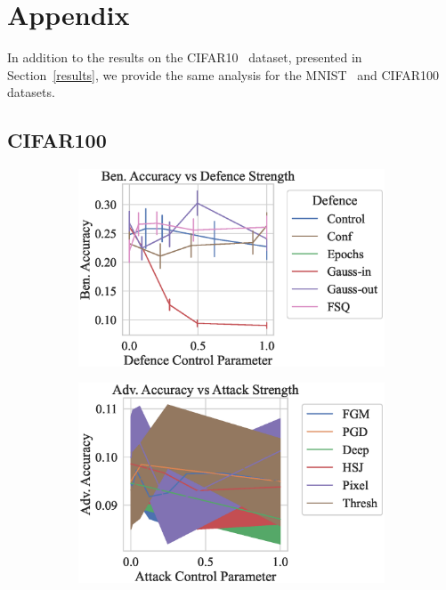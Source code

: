 \section{Appendix}
\label{appendix}

In addition to the results on the CIFAR10~\citep{cifar} dataset, presented in Section~\ref{results}, we provide the same analysis for the MNIST~\citep{mnist} and CIFAR100~\citep{cifar} datasets.


\subsection{CIFAR100}


\begin{figure}
    \centering
    \begin{subfigure}{0.45\textwidth}
        \centering
        \includegraphics[width=\textwidth]{cifar_def_param_vs_accuracy.eps}
    \end{subfigure}
    \begin{subfigure}{0.45\textwidth}
        \centering
        \includegraphics[width=\textwidth]{cifar_atk_param_vs_accuracy.eps}

\end{subfigure}
\end{figure}
